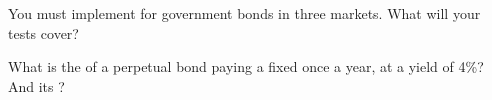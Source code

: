 \begin{interviewq}\label{iq:m2:government-bonds:5}
You must implement  for government bonds in three markets.
What will your tests cover?
\end{interviewq}

\begin{interviewq}\label{iq:m2:government-bonds:6}
What is the  of a perpetual bond paying a fixed  once
a year, at a yield of 4\%? And its ?
\end{interviewq}
